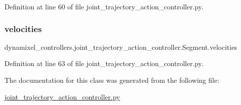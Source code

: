 Definition at line 60 of file joint\+\_\+trajectory\+\_\+action\+\_\+controller.\+py.

\mbox{\label{classdynamixel__controllers_1_1joint__trajectory__action__controller_1_1_segment_abbbbd6c6fd75f91cf2ea77d341d5fb16}} 
\subsubsection{\texorpdfstring{velocities}{velocities}}
{\footnotesize\ttfamily dynamixel\+\_\+controllers.\+joint\+\_\+trajectory\+\_\+action\+\_\+controller.\+Segment.\+velocities}



Definition at line 63 of file joint\+\_\+trajectory\+\_\+action\+\_\+controller.\+py.



The documentation for this class was generated from the following file\+:\begin{DoxyCompactItemize}
\item 
\hyperlink{joint__trajectory__action__controller_8py}{joint\+\_\+trajectory\+\_\+action\+\_\+controller.\+py}\end{DoxyCompactItemize}
